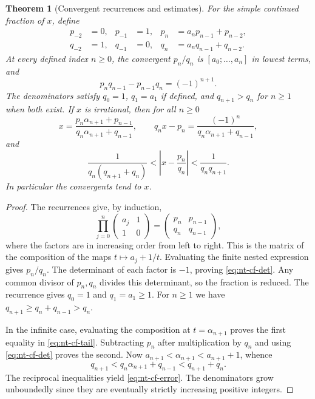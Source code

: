 \documentclass[11pt,oneside,openany]{book}
\theoremstyle{plain}
\newtheorem{theorem}{Theorem}[chapter]
\theoremstyle{definition}
\theoremstyle{remark}
\begin{document}
\begin{theorem}[Convergent recurrences and estimates]
For the simple continued fraction of \(x\), define
\[
 \begin{aligned}
 p_{-2}&=0,&p_{-1}&=1,&p_n&=a_np_{n-1}+p_{n-2},\\
 q_{-2}&=1,&q_{-1}&=0,&q_n&=a_nq_{n-1}+q_{n-2}.
 \end{aligned}
\]
At every defined index \(n\ge0\), the convergent \(p_n/q_n\) is
\([a_0;\ldots,a_n]\) in lowest terms, and
\begin{equation}
 p_nq_{n-1}-p_{n-1}q_n=(-1)^{n+1}.
 \label{eq:nt-cf-det}
\end{equation}
The denominators satisfy \(q_0=1\), \(q_1=a_1\) if defined, and
\(q_{n+1}>q_n\) for \(n\ge1\) when both exist. If \(x\) is irrational,
then for all \(n\ge0\)
\begin{equation}
 x=\frac{p_n\alpha_{n+1}+p_{n-1}}{q_n\alpha_{n+1}+q_{n-1}},\qquad
 q_nx-p_n=\frac{(-1)^n}{q_n\alpha_{n+1}+q_{n-1}},
 \label{eq:nt-cf-tail}
\end{equation}
and
\begin{equation}
 \frac{1}{q_n(q_{n+1}+q_n)}
 < \left|x-\frac{p_n}{q_n}\right|
 < \frac{1}{q_nq_{n+1}}.
 \label{eq:nt-cf-error}
\end{equation}
In particular the convergents tend to \(x\).
\end{theorem}
\begin{proof}
The recurrences give, by induction,
\[
 \prod_{j=0}^{n}
 \begin{pmatrix}a_j&1\\1&0\end{pmatrix}
 =\begin{pmatrix}p_n&p_{n-1}\\q_n&q_{n-1}\end{pmatrix},
\]
where the factors are in increasing order from left to right.
This is the matrix of the composition of the maps \(t\mapsto a_j+1/t\).
Evaluating the finite nested expression gives \(p_n/q_n\).
The determinant of each factor is \(-1\), proving
\eqref{eq:nt-cf-det}. Any common divisor of \(p_n,q_n\) divides this
determinant, so the fraction is reduced. The recurrence gives
\(q_0=1\) and \(q_1=a_1\ge1\). For \(n\ge1\) we have
\(q_{n+1}\ge q_n+q_{n-1}>q_n\).

In the infinite case, evaluating the composition at
\(t=\alpha_{n+1}\) proves the first equality in
\eqref{eq:nt-cf-tail}. Subtracting \(p_n\) after multiplication by
\(q_n\) and using \eqref{eq:nt-cf-det} proves the second.
Now \(a_{n+1}<\alpha_{n+1}<a_{n+1}+1\), whence
\[
 q_{n+1}<q_n\alpha_{n+1}+q_{n-1}<q_{n+1}+q_n.
\]
The reciprocal inequalities yield \eqref{eq:nt-cf-error}. The
denominators grow unboundedly since they are eventually strictly
increasing positive integers.
\end{proof}
\end{document}
